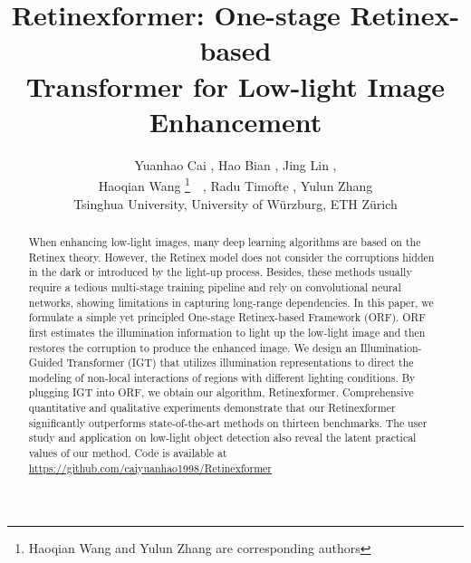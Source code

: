 \documentclass[10pt,twocolumn,letterpaper]{article}
\begin{document}
\title{Retinexformer: One-stage Retinex-based \\ Transformer for  Low-light Image Enhancement}

\iffalse
\author{Yuanhao Cai , Hao Bian , Jing Lin , \\ Haoqian Wang \textsuperscript{\Letter}, Radu Timofte , Yulun Zhang \\
	 Shenzhen International Graduate School, Tsinghua University, \\   Shenzhen Institute of Future Media Technology,  University of W\"urzburg,  ETH Z\"{u}rich
}
\fi

\iffalse
\author{Yuanhao Cai , Hao Bian , Jing Lin , \\ Haoqian Wang \thanks{Haoqian Wang is the corresponding author.}, Radu Timofte , Yulun Zhang \\
	 Shenzhen International Graduate School, Tsinghua University, \\   Shenzhen Institute of Future Media Technology,  University of W\"urzburg,  ETH Z\"{u}rich
}
\fi



\author{Yuanhao Cai , Hao Bian , Jing Lin , \\ Haoqian Wang \thanks{Haoqian Wang and Yulun Zhang are corresponding authors}~~, Radu Timofte , Yulun Zhang \\
	 Tsinghua University,  University of W\"urzburg,  ETH Z\"{u}rich
}


\maketitle
\ificcvfinal\thispagestyle{empty}\fi


\begin{abstract}
\vspace{-2mm}
When enhancing low-light images, many deep learning algorithms are based on the Retinex theory. However, the Retinex model does not consider the corruptions hidden in the dark or introduced by the light-up process. Besides, these methods usually require a tedious multi-stage training pipeline and rely on convolutional neural networks, showing limitations in capturing long-range dependencies. In this paper, we formulate a simple yet principled One-stage Retinex-based Framework (ORF). ORF first estimates the illumination information to light up the low-light image and then restores the corruption to produce the enhanced image. We design an Illumination-Guided Transformer (IGT) that utilizes illumination representations to direct the modeling of non-local interactions of regions with different lighting conditions. By plugging IGT into ORF, we obtain our algorithm, Retinexformer. Comprehensive quantitative and qualitative experiments demonstrate that our Retinexformer significantly outperforms state-of-the-art methods on thirteen benchmarks. The user study and application on low-light object detection also reveal the latent practical values of our method. Code is available at  \url{https://github.com/caiyuanhao1998/Retinexformer}
\end{abstract}
\end{document}
